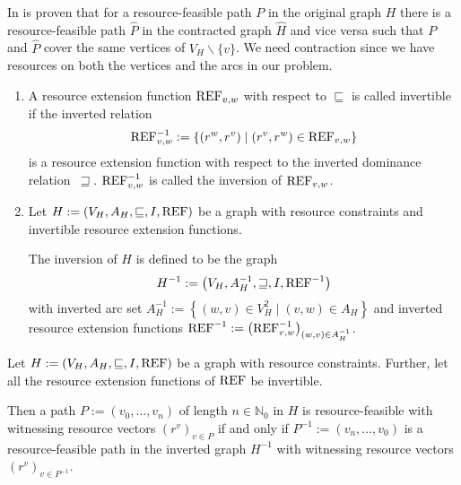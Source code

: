 In \cite[p.~79]{Kaiser} is proven that for a resource-feasible path $P$ in the original graph $H$ there is a resource-feasible path $\widehat{P}$ in the contracted graph $\widehat{H}$ and vice versa such that $P$ and $\widehat{P}$ cover the same vertices of $V_H\backslash\{v\}$. We need contraction since we have resources on both the vertices and the arcs in our problem. 

\begin{definition}[Inversion]
\label{def:inversion}

\begin{enumerate}
	\item{A resource extension function}
$\operatorname{REF}_{v,w}$ with respect to $\sqsubseteq$ is called invertible if the inverted relation
\begin{align*}
	\operatorname{REF}^{-1}_{v,w} := \left\{\left(r^w,r^v\right)\mid\left(r^v,r^w\right)\in\operatorname{REF}_{v,w}\right\}
\end{align*}
is a resource extension function with respect to the inverted dominance relation~$\sqsupseteq$. $\operatorname{REF}^{-1}_{v,w}$ is called the inversion of $\operatorname{REF}_{v,w}$.
	\item{Let}
${H := \left(V_H,A_H,\sqsubseteq,I,\operatorname{REF}\right)}$ be a graph with resource constraints and invertible resource extension functions.

The inversion of $H$ is defined to be the graph
\begin{align*}
	H^{-1} := \left(V_H,A^{-1}_H,\sqsupseteq,I,\operatorname{REF}^{-1}\right)
\end{align*}
with inverted arc set ${A_H^{-1}:=\left\{(w,v)\in V_H^2\mid (v,w)\in A_H\right\}}$ and inverted resource extension functions ${\operatorname{REF}^{-1} := \left(\operatorname{REF}^{-1}_{v,w}\right)_{(w,v)\in A^{-1}_H}}$.
\end{enumerate}

\end{definition}

\begin{theorem}
\label{th:inversion}

Let ${H:=\left(V_H,A_H,\sqsubseteq,I,\operatorname{REF}\right)}$ be a graph with resource constraints. Further, let all the resource extension functions of $\operatorname{REF}$ be invertible.

Then a path ${P := \left(v_0,\dots,v_n\right)}$ of length ${n\in\mathbb{N}_0}$ in $H$ is resource-feasible with witnessing resource vectors $\left(r^v\right)_{v\in P}$ if and only if ${P^{-1} := \left(v_n,\dots,v_0\right)}$ is a resource-feasible path in the inverted graph $H^{-1}$ with witnessing resource vectors $\left(r^v\right)_{v\in P^{-1}}$.

\end{theorem}

